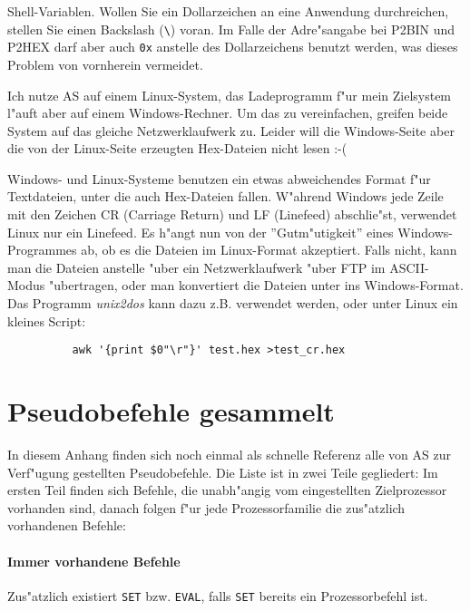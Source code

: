 \documentclass[12pt,a4paper,twoside]{report}
\newcommand{\tty}[1]{{\tt #1}}
\begin{document}
{\begin{description}
{          Shell-Variablen.  Wollen Sie ein Dollarzeichen an eine Anwendung
          durchreichen, stellen Sie einen Backslash (\verb!\!) voran.
          Im Falle der Adre"sangabe bei P2BIN und P2HEX darf aber auch
          \tty{0x} anstelle des Dollarzeichens benutzt werden, was dieses
          Problem von vornherein vermeidet.}
\vspace{0.3cm}
\item[F:]{Ich nutze AS auf einem Linux-System, das Ladeprogramm f"ur
          mein Zielsystem l"auft aber auf einem Windows-Rechner.  Um das
          zu vereinfachen, greifen beide System auf das gleiche
          Netzwerklaufwerk zu.  Leider will die Windows-Seite aber die
          von der Linux-Seite erzeugten Hex-Dateien nicht lesen :-(}
\item[A:]{Windows- und Linux-Systeme benutzen ein etwas abweichendes
          Format f"ur Textdateien, unter die auch Hex-Dateien fallen.  
          W"ahrend Windows jede Zeile mit den Zeichen CR (Carriage Return)
          und LF (Linefeed) abschlie"st, verwendet Linux nur ein Linefeed.
          Es h"angt nun von der ''Gutm"utigkeit'' eines Windows-Programmes
          ab, ob es die Dateien im Linux-Format akzeptiert.  Falls nicht,
          kann man die Dateien anstelle "uber ein Netzwerklaufwerk "uber
          FTP im ASCII-Modus "ubertragen, oder man konvertiert die Dateien
          unter ins Windows-Format.  Das Programm {\em unix2dos} kann dazu
          z.B. verwendet werden, oder unter Linux ein kleines Script:
          \begin{verbatim}
          awk '{print $0"\r"}' test.hex >test_cr.hex
          \end{verbatim}}
\end{description}


\cleardoublepage
\chapter{Pseudobefehle gesammelt}

In diesem Anhang finden sich noch einmal als schnelle Referenz alle
von AS zur Verf"ugung gestellten Pseudobefehle.  Die Liste ist in zwei
Teile gegliedert: Im ersten Teil finden sich Befehle, die unabh"angig
vom eingestellten Zielprozessor vorhanden sind, danach folgen f"ur 
jede Prozessorfamilie die zus"atzlich vorhandenen Befehle:

\subsubsection{Immer vorhandene Befehle}

Zus"atzlich existiert \tty{SET} bzw. \tty{EVAL}, falls \tty{SET} bereits
ein Prozessorbefehl ist.

}
\end{document}
